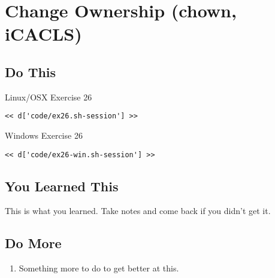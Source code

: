 \chapter{Change Ownership (chown, iCACLS)}

\section{Do This}

\begin{code}{Linux/OSX Exercise 26}
\begin{Verbatim}
<< d['code/ex26.sh-session'] >>
\end{Verbatim}
\end{code}

\begin{code}{Windows Exercise 26}
\begin{Verbatim}
<< d['code/ex26-win.sh-session'] >>
\end{Verbatim}
\end{code}

\section{You Learned This}

This is what you learned.  Take notes and come back if you didn't get it.

\section{Do More}

\begin{enumerate}
\item Something more to do to get better at this.
\end{enumerate}

